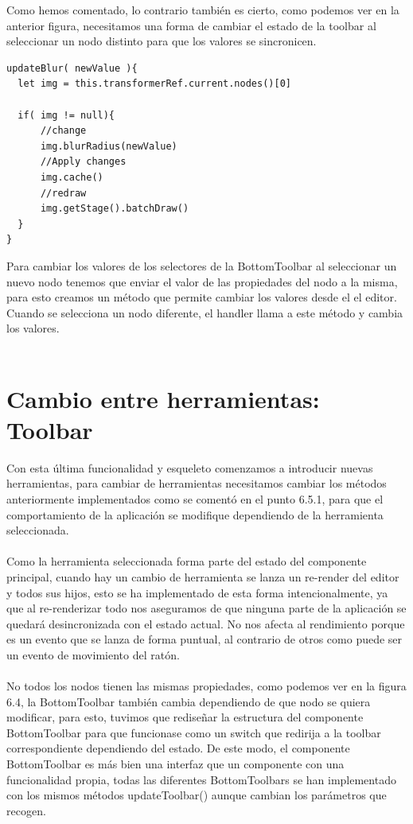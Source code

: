Como hemos comentado, lo contrario también es cierto, como podemos ver en la anterior figura, 
necesitamos una forma de cambiar el estado de la toolbar al seleccionar un nodo distinto
para que los valores se sincronicen.

\newpage

\begin{lstlisting}[caption={Ejemplo de una función updater de la propiedad de un nodo}]
updateBlur( newValue ){
  let img = this.transformerRef.current.nodes()[0]

  if( img != null){
      //change
      img.blurRadius(newValue)
      //Apply changes
      img.cache()
      //redraw
      img.getStage().batchDraw()
  }
}
\end{lstlisting}

Para cambiar los valores de los selectores de la BottomToolbar al seleccionar un nuevo nodo
tenemos que enviar el valor de las propiedades del nodo a la misma, para esto creamos un 
método que permite cambiar los valores desde el el editor. Cuando se selecciona un nodo
diferente, el handler llama a este método y cambia los valores.
\\\\

\section{Cambio entre herramientas: Toolbar}

Con esta última funcionalidad y esqueleto comenzamos a introducir nuevas herramientas, para 
cambiar de herramientas necesitamos cambiar los métodos anteriormente implementados como se 
comentó en el punto 6.5.1, para que el comportamiento de la aplicación se modifique dependiendo
de la herramienta seleccionada.
\\\\
Como la herramienta seleccionada forma parte del estado del componente principal, cuando hay 
un cambio de herramienta se lanza un re-render del editor y todos sus hijos, esto se ha
implementado de esta forma intencionalmente, ya que al re-renderizar todo nos aseguramos de que
ninguna parte de la aplicación se quedará desincronizada con el estado actual. No nos afecta 
al rendimiento porque es un evento que se lanza de forma puntual, al contrario de otros como
puede ser un evento de movimiento del ratón.
\\\\
No todos los nodos tienen las mismas propiedades, como podemos ver en la figura 6.4,
la BottomToolbar también cambia dependiendo de que nodo se quiera modificar, para esto, 
tuvimos que rediseñar la estructura del componente BottomToolbar para que funcionase como un 
switch que redirija a la toolbar correspondiente dependiendo del estado.
De este modo, el componente BottomToolbar es más bien una interfaz que un componente con una 
funcionalidad propia, todas las diferentes BottomToolbars se han implementado con los mismos
métodos updateToolbar() aunque cambian los parámetros que recogen.

